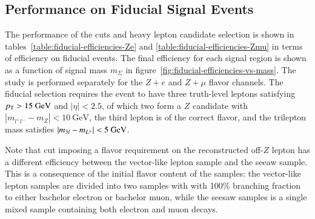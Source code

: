 \subsection{Performance on Fiducial Signal Events}\label{sec:fiducial-cutflow}
The performance of the cuts and heavy lepton candidate selection is shown in tables~\ref{table:fiducial-efficiencies-Ze} and \ref{table:fiducial-efficiencies-Zmu} in terms of efficiency on fiducial events. The final efficiency for each signal region is shown as a function of signal mass $m_{\Sigma}$ in figure~\ref{fig:fiducial-efficiencies-vs-mass}. The study is performed separately for the $Z+e$ and $Z+\mu$ flavor channels. The fiducial selection requires the event to have three truth-level leptons satisfying $p_{\text{T}}>15~\mbox{GeV}$ and $|\eta|<2.5$, of which two form a $Z$ candidate with $|m_{l^+l^-}-m_Z|<10~\mbox{GeV}$, the third lepton is of the correct flavor, and the trilepton mass satisfies $|m_{3l}-m_{L^{\pm}}|<5~\mbox{GeV}$.

Note that cut imposing a flavor requirement on the reconstructed off-$Z$ lepton has a different efficiency between the vector-like lepton sample and the seeaw sample. This is a consequence of the initial flavor content of the samples: the vector-like lepton samples are divided into two samples with with 100\% branching fraction to either bachelor electron or bachelor muon, while the seesaw samples is a single mixed sample containing both electron and muon decays. 


